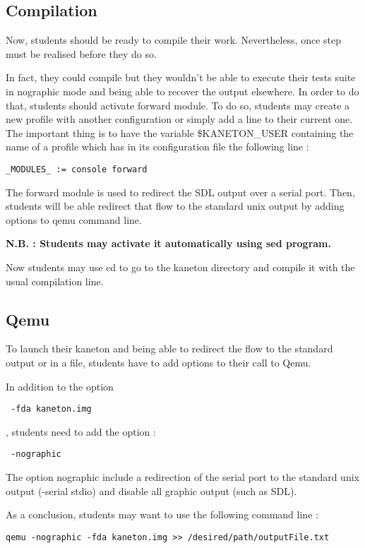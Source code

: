 \subsection{Compilation}
Now, students should be ready to compile their work. Nevertheless, once step must be realised before they do so.

In fact, they could compile but they wouldn't be able to execute their tests suite in nographic mode and being able to recover the output elsewhere. In order to do that, students should activate forward module. To do so, students may create a new profile with another configuration or simply add a line to their current one. The important thing is to have the variable \$KANETON\_USER containing the name of a profile which has in its configuration file the following line :

\begin{verbatim}
_MODULES_ := console forward
\end{verbatim}

The forward module is used to redirect the SDL output over a serial port. Then, students will be able redirect that flow to the standard unix output by adding options to qemu command line.

\textbf{N.B. : Students may activate it automatically using sed program.}

Now students may use cd to go to the kaneton directory and compile it with the usual compilation line.

\subsection{Qemu}
To launch their kaneton and being able to redirect the flow to the standard output or in a file, students have to add options to their call to Qemu.

In addition to  the option
\begin{verbatim} -fda kaneton.img \end{verbatim}
, students need to add the option :
\begin{verbatim} -nographic \end{verbatim}
The option nographic include a redirection of the serial port to the standard unix output (-serial stdio) and disable all graphic output (such as SDL).

As a conclusion, students may want to use the following command line :
\begin{verbatim}
qemu -nographic -fda kaneton.img >> /desired/path/outputFile.txt
\end{verbatim}


